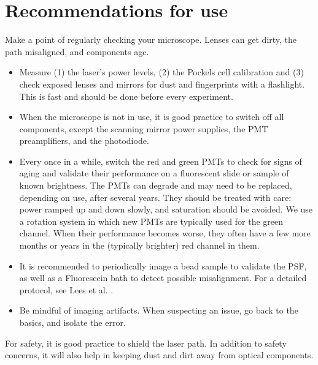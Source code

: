 \documentclass[10pt,letterpaper]{article}
\begin{document}
\section{Recommendations for use}
Make a point of regularly checking your microscope. Lenses can get dirty, the path misaligned, and components age.
%
\begin{itemize}
    \item Measure (1) the laser's power levels, (2) the Pockels cell calibration and (3) check exposed lenses and mirrors for dust and fingerprints with a flashlight. This is fast and should be done before every experiment.
    \item When the microscope is not in use, it is good practice to switch off all components, except the scanning mirror power supplies, the PMT preamplifiers, and the photodiode.
    \item Every once in a while, switch the red and green PMTs to check for signs of aging and validate their performance on a fluorescent slide or sample of known brightness. The PMTs can degrade and may need to be replaced, depending on use, after several years. They should be treated with care: power ramped up and down slowly, and saturation should be avoided. We use a rotation system in which new PMTs are typically used for the green channel. When their performance becomes worse, they often have a few more months or years in the (typically brighter) red channel in them.
    \item It is recommended to periodically image a bead sample to validate the PSF, as well as a Fluorescein bath to detect possible misalignment. For a detailed protocol, see Lees et al. \cite{Lees2024}.
    \item Be mindful of imaging artifacts. When suspecting an issue, go back to the basics, and isolate the error.
\end{itemize}
%
 For safety, it is good practice to shield the laser path. In addition to safety concerns, it will also help in keeping dust and dirt away from optical components.
\newpage
\end{document}
